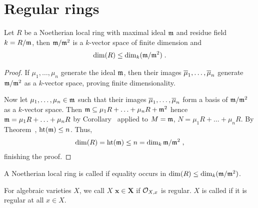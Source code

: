 \documentclass[a4paper,parskip=half,numbers=enddot, DIV=12, headheight=30pt]{scrreprt}
\begin{document}
\section{Regular rings}
\begin{prop}
    Let $R$ be a Noetherian local ring with maximal ideal $\mathfrak{m}$ and residue field $k=R/\mathfrak{m}$, then $\mathfrak{m}/\mathfrak{m}^2$ is a $k$-vector space of finite dimension and 
    \begin{align*}
    	\dim(R) \leq \dim_k(\mathfrak{m}/\mathfrak{m}^2)\;.
    \end{align*}
\end{prop}
\begin{proof}
    If $\mu_1,\ldots,\mu_n$ generate the ideal $\mathfrak{m}$, then their images $\overline{\mu}_1,\ldots,\overline{\mu}_n$ generate $\mathfrak{m}/\mathfrak{m}^2$ as a $k$-vector space, proving finite dimensionality. 
    
    Now let $\mu_1,\ldots,\mu_n\in\mathfrak{m}$ such that their images $\overline{\mu}_1,\ldots,\overline{\mu}_n$ form a basis of $\mathfrak{m}/\mathfrak{m}^2$ as a $k$-vector space. Then $\mathfrak{m} \subseteq \mu_1R+\ldots+\mu_nR+\mathfrak{m}^2$ hence $\mathfrak{m} = \mu_1R+\ldots+\mu_nR$ by Corollary~ applied to $M = \mathfrak{m}$, $N = \mu_1R+\ldots+\mu_nR$. By Theorem~, $\operatorname{ht}(\mathfrak{m}) \leq n$. Thus,
    \begin{align*}
    	\dim (R) = \operatorname{ht}(\mathfrak{m}) \leq n = \dim_k \mathfrak{m}/\mathfrak{m}^2\;,
    \end{align*}
    finishing the proof.
\end{proof}
\begin{defi}[Regularity]
	\begin{alphanumerate}
		\item A Noetherian local ring is called  if equality occurs in $\dim (R) \leq\dim_k(\mathfrak{m}/\mathfrak{m}^2)$. 
		\item For algebraic varieties $X$, we call $X$  $\boldsymbol{x\in X}$ if $\mathcal{O}_{X,x}$ is regular. $X$ is called  if it is regular at all $x\in X$.
	\end{alphanumerate}
\end{defi}
\end{document}
